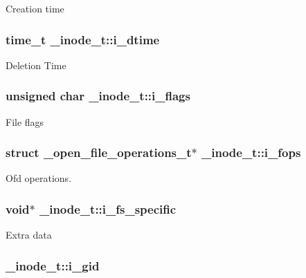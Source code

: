 Creation time \hypertarget{struct__inode__t_a393de4c58241168fdf397ab8421a3539}{
\subsubsection[{i\-\_\-dtime}]{\setlength{\rightskip}{0pt plus 5cm}time\-\_\-t \-\_\-inode\-\_\-t\-::i\-\_\-dtime}}\label{struct__inode__t_a393de4c58241168fdf397ab8421a3539}
Deletion Time \hypertarget{struct__inode__t_a36ff48a57a9e483d74682972d31ef46c}{
\subsubsection[{i\-\_\-flags}]{\setlength{\rightskip}{0pt plus 5cm}unsigned char \-\_\-inode\-\_\-t\-::i\-\_\-flags}}\label{struct__inode__t_a36ff48a57a9e483d74682972d31ef46c}
File flags \hypertarget{struct__inode__t_acf149d7d1601f78142b1eec480badf7e}{
\subsubsection[{i\-\_\-fops}]{\setlength{\rightskip}{0pt plus 5cm}struct {\bf \-\_\-open\-\_\-file\-\_\-operations\-\_\-t}$\ast$ \-\_\-inode\-\_\-t\-::i\-\_\-fops}}\label{struct__inode__t_acf149d7d1601f78142b1eec480badf7e}
Ofd operations. \hypertarget{struct__inode__t_a54e34439c448c46bae90fd040dadc5c0}{
\subsubsection[{i\-\_\-fs\-\_\-specific}]{\setlength{\rightskip}{0pt plus 5cm}void$\ast$ \-\_\-inode\-\_\-t\-::i\-\_\-fs\-\_\-specific}}\label{struct__inode__t_a54e34439c448c46bae90fd040dadc5c0}
Extra data \hypertarget{struct__inode__t_a95d052a6e9b1b1e4f6837fa0f33b393e}{
\subsubsection[{i\-\_\-gid}]{ \-\_\-inode\-\_\-t\-::i\-\_\-gid}}\label{struct__inode__t_a95d052a6e9b1b1e4f6837fa0f33b393e}
